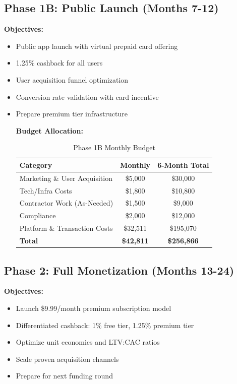 \documentclass[11pt,letterpaper]{article}
\begin{document}
\newpage
\subsection{Phase 1B: Public Launch (Months 7-12)}

\textbf{Objectives:}
\begin{itemize}
\item Public app launch with virtual prepaid card offering
\item 1.25\% cashback for all users
\item User acquisition funnel optimization
\item Conversion rate validation with card incentive
\item Prepare premium tier infrastructure

\textbf{Budget Allocation:}
\begin{table}[htbp]
\centering
\caption{Phase 1B Monthly Budget}
\begin{tabular}{|l|c|c|}
\hline
\textbf{Category} & \textbf{Monthly} & \textbf{6-Month Total} \\
\hline
Marketing \& User Acquisition & \$5,000 & \$30,000 \\
Tech/Infra Costs & \$1,800& \$10,800\\
Contractor Work (As-Needed) & \$1,500 & \$9,000 \\
Compliance & \$2,000 & \$12,000 \\
Platform \& Transaction Costs & \$32,511& \$195,070\\
\hline
\textbf{Total} & \textbf{\$42,811} & \textbf{\$256,866} \\
\hline
\end{tabular}
\end{table}
\end{itemize}

\vspace{1em}

\subsection{Phase 2: Full Monetization (Months 13-24)}
\textbf{Objectives:}
\begin{itemize}
\item Launch \$9.99/month premium subscription model
\item Differentiated cashback: 1\% free tier, 1.25\% premium tier
\item Optimize unit economics and LTV:CAC ratios
\item Scale proven acquisition channels
\item Prepare for next funding round
\end{itemize}
\end{document}
